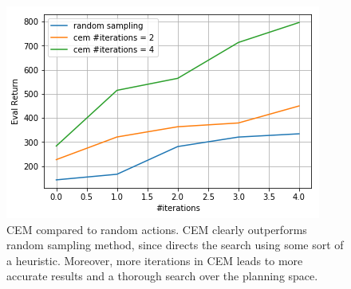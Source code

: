 \documentclass[11pt]{article}
\begin{document}
\begin{figure}[htbp]
\centering
\includegraphics[width=.9\linewidth]{./cem.png}
\caption{CEM compared to random actions. CEM clearly outperforms random sampling method, since directs the search using some sort of a heuristic. Moreover, more iterations in CEM leads to more accurate results and a thorough search over the planning space.}
\end{figure}
\end{document}

